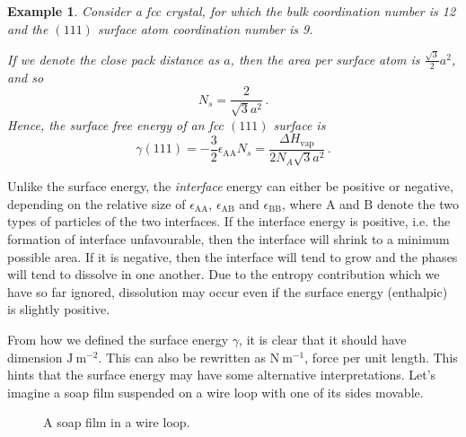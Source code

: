 \documentclass{article}
\theoremstyle{plain}\theoremheaderfont{\normalfont\itshape}\theorembodyfont{\rmfamily}\theoremseparator{.}\newtheorem*{rem}{Remark}\newtheorem*{ex}{Example}\newtheorem*{proof}{Proof}\newtheorem*{altp}{Alternative proof}
\theoremstyle{plain}\theoremheaderfont{\normalfont\bfseries}\theorembodyfont{\rmfamily}\theoremseparator{.}\newtheorem{thm}{Theorem}[section]\newtheorem{lem}[thm]{Lemma}\newtheorem{prop}[thm]{Proposition}\newtheorem*{cor}{Corollary}\newtheorem{defn}[thm]{Definition}\newtheorem{clm}[thm]{Claim}\newtheorem{clminproof}{Claim}\newtheorem*{law}{Law}\newtheorem{pos}[thm]{Postulate}
\theoremstyle{break}\theoremheaderfont{\normalfont\itshape}\theorembodyfont{\rmfamily}\theoremseparator{.\medskip}\newtheorem*{proofskip}{Proof}\newtheorem*{exs}{Examples}\newtheorem*{rems}{Remarks}
\theoremstyle{break}\theoremheaderfont{\normalfont\bfseries}\theorembodyfont{\rmfamily}\theoremseparator{.\medskip}\newtheorem{lemskip}[thm]{Lemma}\newtheorem{defnskip}[thm]{Definition}\newtheorem{propskip}[thm]{Proposition}\newtheorem{thmskip}[thm]{Theorem}
\numberwithin{equation}{section}
\newcommand{\unit}[1]{\ \mathrm{#1}}
\newcommand{\A}{\mathrm{A}}
\newcommand{\B}{\mathrm{B}}
\begin{document}
	\begin{ex}
		Consider a fcc crystal, for which the bulk coordination number is 12 and the \((111)\) surface atom coordination number is 9.
		
		If we denote the close pack distance as \(a\), then the area per surface atom is \(\frac{\sqrt{3}}{2}a^2\), and so
		\begin{equation}
			N_s=\frac{2}{\sqrt{3}a^2}\,.
		\end{equation}
		Hence, the surface free energy of an fcc \((111)\) surface is
		\begin{equation}
			\gamma(111)=-\frac{3}{2}\epsilon_{\A\A}N_s=\frac{\Delta H_{\text{vap}}}{2N_A\sqrt{3}a^2}\,.
		\end{equation}
	\end{ex}

	Unlike the surface energy, the \textit{interface} energy can either be positive or negative, depending on the relative size of \(\epsilon_{\A\A}\), \(\epsilon_{\A\B}\) and \(\epsilon_{\B\B}\), where \(\A\) and \(\B\) denote the two types of particles of the two interfaces. If the interface energy is positive, i.e. the formation of interface unfavourable, then the interface will shrink to a minimum possible area. If it is negative, then the interface will tend to grow and the phases will tend to dissolve in one another. Due to the entropy contribution which we have so far ignored, dissolution may occur even if the surface energy (enthalpic) is slightly positive.

	From how we defined the surface energy \(\gamma\), it is clear that it should have dimension \(\mathrm{J}\unit{m}^{-2}\). This can also be rewritten as \(\mathrm{N}\unit{m}^{-1}\), force per unit length. This hints that the surface energy may have some alternative interpretations. Let's imagine a soap film suspended on a wire loop with one of its sides movable.

	\begin{figure}[ht!]
		\centering
		\caption{A soap film in a wire loop.}
	\end{figure}
\end{document}
